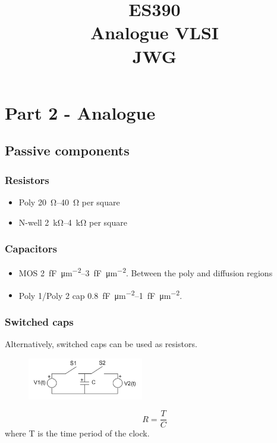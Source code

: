 \documentclass[a4paper,twocolumn]{article}
\title{ES390 \\ Analogue VLSI \\ JWG}
\begin{document}
	\section{Part 2 - Analogue}
		\subsection{Passive components}
			\subsubsection{Resistors}
				\begin{itemize}
					\item Poly \SIrange{20}{40}{\ohm} per square
					\item N-well \SIrange{2}{4}{\kilo \ohm} per square
				\end{itemize}
			\subsubsection{Capacitors}
				\begin{itemize}
					\item MOS \SIrange{2}{3}{\femto \farad \per \square \micro \meter}.
					Between the poly and diffusion regions
					\item Poly 1/Poly 2 cap  \SIrange{0.8}{1}{\femto \farad \per \square \micro \meter}.
				\end{itemize}
			\subsubsection{Switched caps}
				Alternatively, switched caps can be used as resistors.
				\begin{figure}[ht]
					\centering
					\includegraphics[width=0.45\textwidth]{switched_cap}
				\end{figure}
				\begin{equation}
					R = \frac{T}{C}
				\end{equation}
				where T is the time period of the clock.
\end{document}
